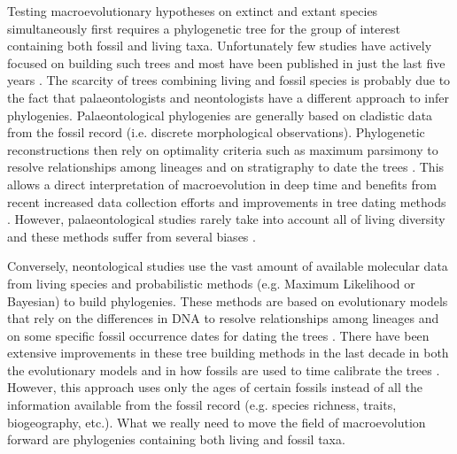 
Testing macroevolutionary hypotheses on extinct and extant species simultaneously first requires a phylogenetic tree for the group of interest containing both fossil and living taxa.
Unfortunately few studies have actively focused on building such trees and most have been published in just the last five years \citep[e.g.][]{ronquista2012,Slater2012MEE,beckancient2014}.
The scarcity of trees combining living and fossil species is probably due to the fact that palaeontologists and neontologists have a different approach to infer phylogenies.
Palaeontological phylogenies are generally based on cladistic data from the fossil record (i.e. discrete morphological observations).
Phylogenetic reconstructions then rely on optimality criteria such as maximum parsimony \citep{Hennig1966,felsenstein2004} to resolve relationships among lineages and on stratigraphy to date the trees \citep{GoloboffTNT}.
This allows a direct interpretation of macroevolution in deep time and benefits from recent increased data collection efforts \citep[e.g. 4541 characters in][introducing the term ``phenomics'']{O'Leary08022013} and improvements in tree dating methods \citep[e.g. the \textit{cal3} method from][]{Bapst2014}.
However, palaeontological studies rarely take into account all of living diversity \citep[e.g. only 38 out of 351 living primates are included with 119 fossils in][]{ni2013oldest} and these methods suffer from several biases \citep[e.g. evolution is not parsimonious;][]{wrightbayesian2014}.

Conversely, neontological studies use the vast amount of available molecular data from living species and probabilistic methods (e.g. Maximum Likelihood or Bayesian) to build phylogenies.
These methods are based on evolutionary models that rely on the differences in DNA to resolve relationships among lineages and on some specific fossil occurrence dates for dating the trees \citep[i.e. the molecular clock;][]{zuckerkandl1965}.
There have been extensive improvements in these tree building methods in the last decade in both the evolutionary models \citep[e.g.][]{bapsta2013,stadlerdating2013,heaththe2013} and in how fossils are used to time calibrate the trees \citep{Donoghue2007424,Parham01032012}.
However, this approach uses only the ages of certain fossils instead of all the information available from the fossil record (e.g. species richness, traits, biogeography, etc.).
What we really need to move the field of macroevolution forward are phylogenies containing both living and fossil taxa.

